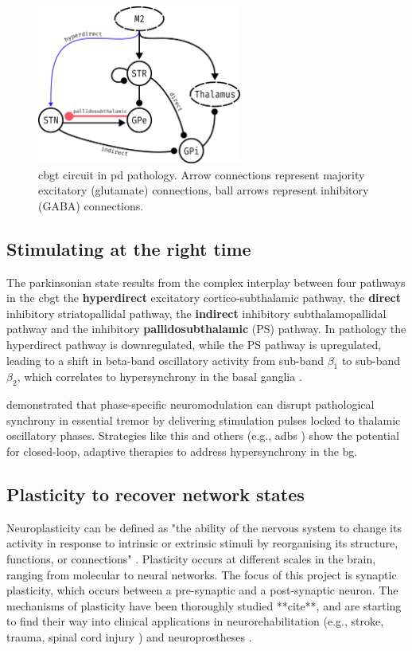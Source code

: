 \begin{figure}[ht]
	\centering
	\includegraphics[width=0.6\textwidth]{figs/cbgt_circuit.pdf}
	\caption{\acrshort{cbgt} circuit in \acrshort{pd} pathology. Arrow connections represent majority excitatory (glutamate) connections,
		ball arrows represent inhibitory (GABA) connections.}
\end{figure}

\subsection{Stimulating at the right time}
The parkinsonian state results from the complex interplay between four pathways in the \acrshort{cbgt}
the \textbf{hyperdirect} excitatory cortico-subthalamic pathway,
the \textbf{direct} inhibitory striatopallidal pathway,
the \textbf{indirect} inhibitory subthalamopallidal pathway and
the inhibitory \textbf{pallidosubthalamic} (PS) pathway. In pathology the hyperdirect
pathway is downregulated, while the PS pathway is upregulated, leading to a shift in
beta-band oscillatory activity from sub-band $\beta_1$ to sub-band $\beta_2$, which correlates to
hypersynchrony in the basal ganglia \cite{west2022stimulating}.

\cite{cagnan2017stimulating} demonstrated that phase-specific neuromodulation can disrupt pathological
synchrony in essential tremor by delivering stimulation pulses locked to thalamic oscillatory phases.
Strategies like this and others (e.g., \acrshort{adbs} \cite{beudel2018adaptive}) show the potential for closed-loop,
adaptive therapies to address hypersynchrony in the \acrshort{bg}.

\subsection{Plasticity to recover network states}
Neuroplasticity can be defined as "the ability of the nervous system to change its activity in
response to intrinsic or extrinsic stimuli by reorganising its structure, functions, or
connections" \cite{mateos2019impact}.
Plasticity occurs at different scales in the brain, ranging from molecular to neural networks.
The focus of this project is synaptic plasticity, which occurs between a pre-synaptic and a
post-synaptic neuron. The mechanisms of plasticity have been thoroughly studied **cite**, and
are starting to find their way into clinical applications in neurorehabilitation (e.g., stroke, trauma,
spinal cord injury \cite{cramer2011harnessing}) and neuroprostheses \cite{lebedev2017brain}.

